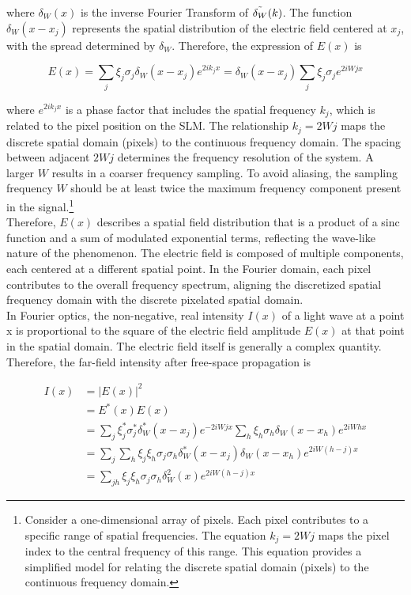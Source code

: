 where $\delta_W(x)$ is the inverse Fourier Transform of $\Tilde{\delta_W}(k)$. The function $\delta_W(x-x_j)$ represents the spatial distribution of the electric field centered at $x_j$, with the spread determined by $\delta_W$. Therefore, the expression of $E(x)$ is 

\begin{equation}
E(x) = \sum_j {\xi_j \sigma_j} \delta_W (x-x_j) e^{2ik_jx} = \delta_W (x-x_j) \sum_j {\xi_j \sigma_j}  e^{2iWjx}
\end{equation}

where $e^{2ik_jx}$  is a phase factor that includes the spatial frequency $k_j$, which is related to the pixel position on the SLM. The relationship $k_j = 2Wj$ maps the discrete spatial domain (pixels) to the continuous frequency domain. The spacing between adjacent $2Wj$ determines the frequency resolution of the system. A larger $W$ results in a coarser frequency sampling. To avoid aliasing, the sampling frequency $W$ should be at least twice the maximum frequency component present in the signal.\footnote{Consider a one-dimensional array of pixels. Each pixel contributes to a specific range of spatial frequencies. The equation $k_j = 2Wj$ maps the pixel index to the central frequency of this range. This equation provides a simplified model for relating the discrete spatial domain (pixels) to the continuous frequency domain.} \\

Therefore, $E(x)$ describes a spatial field distribution that is a product of a sinc function and a sum of modulated exponential terms, reflecting the wave-like nature of the phenomenon. The electric field is composed of multiple components, each centered at a different spatial point. In the Fourier domain, each pixel contributes to the overall frequency spectrum, aligning the discretized spatial frequency domain with the discrete pixelated spatial domain. \\

In Fourier optics, the non-negative, real intensity $I(x)$ of a light wave at a point x is proportional to the square of the electric field amplitude $E(x)$ at that point in the spatial domain. The electric field itself is generally a complex quantity. Therefore, the far-field intensity after free-space propagation is

\begin{equation}
\begin{aligned}
I(x) &= |E(x)|^2 \\
     &= E^*(x) E(x) \\
     &= \sum_{j} {\xi_j^* \sigma_j^* \delta_W^*(x-x_j) e^{-2iWjx}} \sum_{h} {\xi_h \sigma_h \delta_W(x-x_h) e^{2iWhx}} \\
     &= \sum_{j} \sum_{h} {\xi_j \xi_h \sigma_j  \sigma_h \delta_W^*(x-x_j)} \delta_W(x-x_h) e^{2iW(h-j)x} \\
     &= \sum_{jh} {\xi_j \xi_h \sigma_j  \sigma_h \delta_W^2(x) e^{2iW(h-j)x}}
\end{aligned}
\end{equation}

